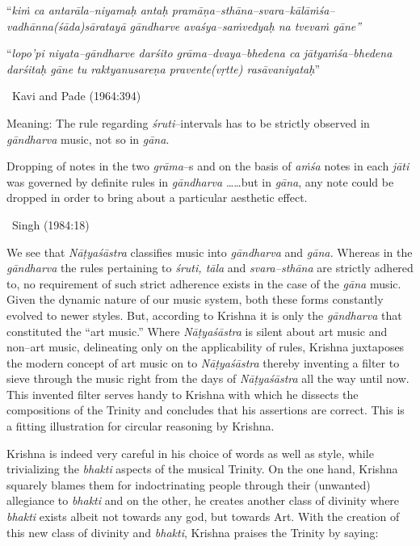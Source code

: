 \begin{myquote}
“\textit{kiṁ ca antarāla–niyamaḥ antaḥ pramāṇa–sthāna–svara–kālāṁśa–vadhānna\break (śāda)sāratayā gāndharve avaśya–saṁvedyaḥ  na tvevaṁ gāne”}
\end{myquote}

\begin{myquote}
“\textit{lopo’pi niyata–gāndharve darśito grāma–dvaya–bhedena ca jātyaṁśa–bhedena darśitaḥ  gāne tu raktyanusareṇa pravente(vṛtte) rasāvaniyataḥ}” 

~\hfill Kavi and Pade (1964:394)
\end{myquote}

\begin{myquote}
Meaning: The rule regarding \textit{śruti}–intervals has to be strictly observed in \textit{gāndharva} music, not so in \textit{gāna}.
\end{myquote}

\begin{myquote}
Dropping of notes in the two \textit{grāma}–s and on the basis of \textit{aṁśa} notes in each \textit{jāti} was governed by definite rules in \textit{gāndharva} ……but in \textit{gāna}, any note could be dropped in order to bring about a particular aesthetic effect. 

~\hfill Singh (1984:18)
\end{myquote}

We see that \textit{Nāṭyaśāstra} classifies music into \textit{gāndharva} and \textit{gāna.} Whereas in the \textit{gāndharva} the rules pertaining to \textit{śruti, tāla} and \textit{svara–sthāna} are strictly adhered to, no requirement of such strict adherence exists in the case of the \textit{gāna} music. Given the dynamic nature of our music system, both these forms constantly evolved to newer styles. But, according to Krishna it is only the \textit{gāndharva} that constituted the “art music.” Where \textit{Nāṭyaśāstra} is silent about art music and non–art music, delineating only on the applicability of rules, Krishna juxtaposes the modern concept of art music on to \textit{Nāṭyaśāstra} thereby inventing a filter to sieve through the music right from the days of \textit{Nāṭyaśāstra} all the way until now. This invented filter serves handy to Krishna with which he dissects the compositions of the Trinity and concludes that his assertions are correct. This is a fitting illustration for circular reasoning by Krishna.

Krishna is indeed very careful in his choice of words as well as style, while trivializing the \textit{bhakti} aspects of the musical Trinity. On the one hand, Krishna squarely blames them for indoctrinating people through their (unwanted) allegiance to \textit{bhakti} and on the other, he creates another class of divinity where \textit{bhakti} exists albeit not towards any god, but towards Art. With the creation of this new class of divinity and \textit{bhakti}, Krishna praises the Trinity by saying:

